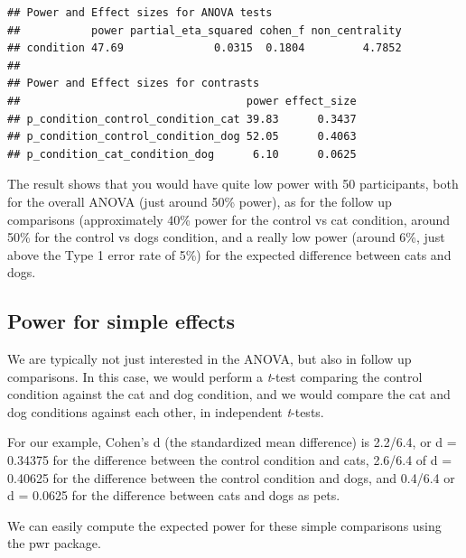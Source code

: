 \documentclass[]{book}
\newenvironment{Shaded}{\begin{snugshade}}{\end{snugshade}}
\newcommand{\CommentTok}[1]{\textcolor[rgb]{0.56,0.35,0.01}{\textit{#1}}}
\newcommand{\DataTypeTok}[1]{\textcolor[rgb]{0.13,0.29,0.53}{#1}}
\newcommand{\DecValTok}[1]{\textcolor[rgb]{0.00,0.00,0.81}{#1}}
\newcommand{\FloatTok}[1]{\textcolor[rgb]{0.00,0.00,0.81}{#1}}
\newcommand{\KeywordTok}[1]{\textcolor[rgb]{0.13,0.29,0.53}{\textbf{#1}}}
\newcommand{\NormalTok}[1]{#1}
\newcommand{\OperatorTok}[1]{\textcolor[rgb]{0.81,0.36,0.00}{\textbf{#1}}}
\newcommand{\StringTok}[1]{\textcolor[rgb]{0.31,0.60,0.02}{#1}}
\begin{document}
\begin{verbatim}
## Power and Effect sizes for ANOVA tests
##           power partial_eta_squared cohen_f non_centrality
## condition 47.69              0.0315  0.1804         4.7852
## 
## Power and Effect sizes for contrasts
##                                   power effect_size
## p_condition_control_condition_cat 39.83      0.3437
## p_condition_control_condition_dog 52.05      0.4063
## p_condition_cat_condition_dog      6.10      0.0625
\end{verbatim}

\begin{Shaded}
\end{Shaded}

The result shows that you would have quite low power with 50 participants, both for the overall ANOVA (just around 50\% power), as for the follow up comparisons (approximately 40\% power for the control vs cat condition, around 50\% for the control vs dogs condition, and a really low power (around 6\%, just above the Type 1 error rate of 5\%) for the expected difference between cats and dogs.

\hypertarget{power-for-simple-effects}{%
\subsection{Power for simple effects}\label{power-for-simple-effects}}

We are typically not just interested in the ANOVA, but also in follow up comparisons. In this case, we would perform a \emph{t}-test comparing the control condition against the cat and dog condition, and we would compare the cat and dog conditions against each other, in independent \emph{t}-tests.

For our example, Cohen's d (the standardized mean difference) is 2.2/6.4, or d = 0.34375 for the difference between the control condition and cats, 2.6/6.4 of d = 0.40625 for the difference between the control condition and dogs, and 0.4/6.4 or d = 0.0625 for the difference between cats and dogs as pets.

We can easily compute the expected power for these simple comparisons using the pwr package.

\begin{Shaded}
\end{Shaded}
\end{document}
